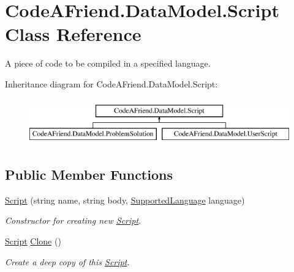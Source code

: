 \hypertarget{class_code_a_friend_1_1_data_model_1_1_script}{}\section{Code\+A\+Friend.\+Data\+Model.\+Script Class Reference}
\label{class_code_a_friend_1_1_data_model_1_1_script}


A piece of code to be compiled in a specified language.  


Inheritance diagram for Code\+A\+Friend.\+Data\+Model.\+Script\+:\begin{figure}[H]
\begin{center}
\leavevmode
\includegraphics[height=2.000000cm]{class_code_a_friend_1_1_data_model_1_1_script}
\end{center}
\end{figure}
\subsection*{Public Member Functions}
\begin{DoxyCompactItemize}
\item 
\mbox{\hyperlink{class_code_a_friend_1_1_data_model_1_1_script_a1f92caf940d4376a3f2e96833b3ee029}{Script}} (string name, string body, \mbox{\hyperlink{namespace_code_a_friend_1_1_data_model_a13e088c525db1b03a4de75420ced79b2}{Supported\+Language}} language)
\begin{DoxyCompactList}\small\item\em Constructor for creating new \mbox{\hyperlink{class_code_a_friend_1_1_data_model_1_1_script}{Script}}.\end{DoxyCompactList}\item 
\mbox{\hyperlink{class_code_a_friend_1_1_data_model_1_1_script}{Script}} \mbox{\hyperlink{class_code_a_friend_1_1_data_model_1_1_script_a02124202d7f885992a243853531b3216}{Clone}} ()
\begin{DoxyCompactList}\small\item\em Create a deep copy of this \mbox{\hyperlink{class_code_a_friend_1_1_data_model_1_1_script}{Script}}. \end{DoxyCompactList}\end{DoxyCompactItemize}
